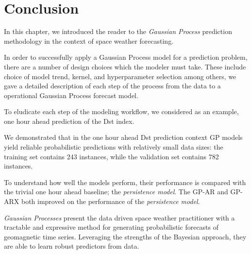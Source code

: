 \documentclass{article}
\begin{document}
\section{Conclusion}

In this chapter, we introduced the reader to the \emph{Gaussian
  Process} prediction methodology in the context of space weather forecasting.

In order to successfully apply a Gaussian Process model for a
prediction problem, there are a number of design choices which the
modeler must take. These include choice of model trend, kernel, and
hyperparameter selection among others, we gave a detailed
description of each step of the process from the data to a operational
Gaussian Process forecast model.

To eludicate each step of the modeling workflow, we
considered as an example, one hour ahead prediction of the Dst
index.

We demonstrated that in the one hour ahead Dst prediction
context GP models yield reliable probabilistic predictions with
relatively small data sizes: the training set contains 243
instances, while the validation set contains 782 instances.

To understand how well the models perform, their performance is
compared with the trivial one hour ahead baseline; the
\emph{persistence model}. The GP-AR and GP-ARX both improved on the
performance of the \emph{persistence model}.

\emph{Gaussian Processes} present the data driven space weather practitioner with
a tractable and expressive method for generating probabilistic
forecasts of geomagnetic time series. Leveraging the strengths of the
Bayesian approach, they are able to learn robust predictors from data.
\end{document}
